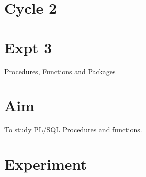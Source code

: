 \documentclass[13pt,oneside]{book}
\begin{document}
\section*{Cycle 2}
\section*{Expt 3}
\begin{center}
    \Large{Procedures, Functions and Packages}
\end{center}

\section*{Aim}
\large To study PL/SQL Procedures and functions.

\section*{Experiment}
\end{document}
